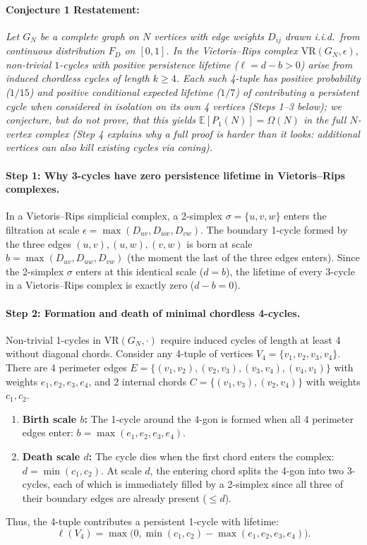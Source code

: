 \documentclass{article}
\begin{document}
\paragraph{Conjecture 1 Restatement:} \textit{Let $G_N$ be a complete graph on $N$ vertices with edge weights $D_{ij}$ drawn i.i.d.\ from continuous distribution $F_D$ on $[0,1]$. In the Vietoris--Rips complex $\mathrm{VR}(G_N, \epsilon)$, non-trivial $1$-cycles with positive persistence lifetime ($\ell = d - b > 0$) arise from induced chordless cycles of length $k \ge 4$. Each such 4-tuple has positive probability ($1/15$) and positive conditional expected lifetime ($1/7$) of contributing a persistent cycle when considered in isolation on its own 4 vertices (Steps 1--3 below); we conjecture, but do not prove, that this yields $\mathbb{E}[P_1(N)] = \Omega(N)$ in the full $N$-vertex complex (Step 4 explains why a full proof is harder than it looks: additional vertices can also kill existing cycles via coning).}

\paragraph{Step 1: Why 3-cycles have zero persistence lifetime in Vietoris--Rips complexes.}
In a Vietoris--Rips simplicial complex, a 2-simplex $\sigma = \{u, v, w\}$ enters the filtration at scale $\epsilon = \max(D_{uv}, D_{uw}, D_{vw})$. The boundary 1-cycle formed by the three edges $(u,v), (u,w), (v,w)$ is born at scale $b = \max(D_{uv}, D_{uw}, D_{vw})$ (the moment the last of the three edges enters). Since the 2-simplex $\sigma$ enters at this identical scale ($d = b$), the lifetime of every 3-cycle in a Vietoris--Rips complex is exactly zero ($d - b = 0$).

\paragraph{Step 2: Formation and death of minimal chordless 4-cycles.}
Non-trivial 1-cycles in $\mathrm{VR}(G_N, \cdot)$ require induced cycles of length at least 4 without diagonal chords. Consider any 4-tuple of vertices $V_4 = \{v_1, v_2, v_3, v_4\}$. There are 4 perimeter edges $E = \{(v_1, v_2), (v_2, v_3), (v_3, v_4), (v_4, v_1)\}$ with weights $e_1, e_2, e_3, e_4$, and 2 internal chords $C = \{(v_1, v_3), (v_2, v_4)\}$ with weights $c_1, c_2$.
\begin{enumerate}
    \item \textbf{Birth scale $b$:} The 1-cycle around the 4-gon is formed when all 4 perimeter edges enter: $b = \max(e_1, e_2, e_3, e_4)$.
    \item \textbf{Death scale $d$:} The cycle dies when the first chord enters the complex: $d = \min(c_1, c_2)$. At scale $d$, the entering chord splits the 4-gon into two 3-cycles, each of which is immediately filled by a 2-simplex since all three of their boundary edges are already present ($\le d$).
\end{enumerate}
Thus, the 4-tuple contributes a persistent 1-cycle with lifetime:
\begin{equation}
    \ell(V_4) = \max\Big(0, \min(c_1, c_2) - \max(e_1, e_2, e_3, e_4)\Big).
\end{equation}
\end{document}
